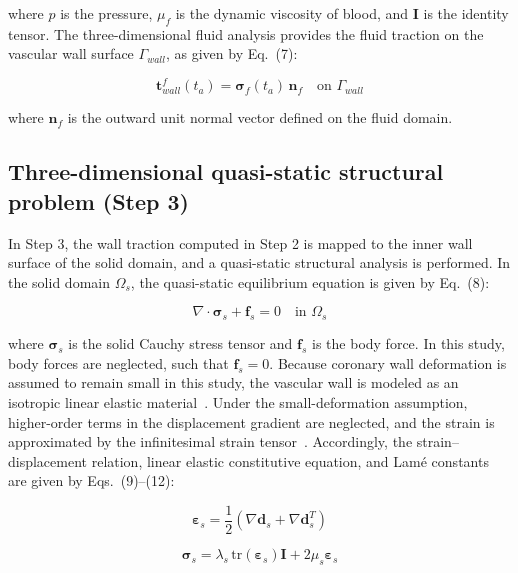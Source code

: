 \documentclass[master,english,final]{kaist-ucs}
\begin{document}
where $p$ is the pressure, $\mu_f$ is the dynamic viscosity of blood, and $\mathbf{I}$ is the identity tensor. The three-dimensional fluid analysis provides the fluid traction on the vascular wall surface $\Gamma_{wall}$, as given by Eq.~(7):

\begin{equation}
\mathbf{t}_{wall}^{f}(t_a) = \boldsymbol{\sigma}_f(t_a)\,\mathbf{n}_f \quad \text{on } \Gamma_{wall}
\end{equation}

where $\mathbf{n}_f$ is the outward unit normal vector defined on the fluid domain.

\subsection{Three-dimensional quasi-static structural problem (Step 3)}
In Step 3, the wall traction computed in Step 2 is mapped to the inner wall surface of the solid domain, and a quasi-static structural analysis is performed. In the solid domain $\Omega_s$, the quasi-static equilibrium equation is given by Eq.~(8):

\begin{equation}
\nabla \cdot \boldsymbol{\sigma}_s + \mathbf{f}_s = 0 \quad \text{in } \Omega_s
\end{equation}

where $\boldsymbol{\sigma}_s$ is the solid Cauchy stress tensor and $\mathbf{f}_s$ is the body force. In this study, body forces are neglected, such that $\mathbf{f}_s = 0$. Because coronary wall deformation is assumed to remain small in this study, the vascular wall is modeled as an isotropic linear elastic material~\cite{cheng1993}. Under the small-deformation assumption, higher-order terms in the displacement gradient are neglected, and the strain is approximated by the infinitesimal strain tensor~\cite{boresi2003}. Accordingly, the strain--displacement relation, linear elastic constitutive equation, and Lam\'e constants are given by Eqs.~(9)--(12):

\begin{equation}
\boldsymbol{\varepsilon}_s = \frac{1}{2}\left(\nabla\mathbf{d}_s + \nabla\mathbf{d}_s^{T}\right)
\end{equation}

\begin{equation}
\boldsymbol{\sigma}_s = \lambda_s\,\mathrm{tr}(\boldsymbol{\varepsilon}_s)\mathbf{I} + 2\mu_s\boldsymbol{\varepsilon}_s
\end{equation}
\end{document}
